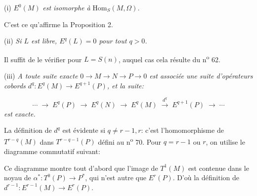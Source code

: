 (i) $E^0(M)$ \textit{est isomorphe à} $\mathrm{Hom}_S(M, \Omega)$.

C'est ce qu'affirme la Proposition 2.

(ii) \textit{Si $L$ est libre, $E^q(L) = 0$ pour tout $q > 0$.}

Il suffit de le vérifier pour $L = S(n)$, auquel cas cela résulte du n\textsuperscript{o} 62.

(iii) \textit{A toute suite exacte $0 \to M \to N \to P \to 0$ est associée une suite d'opérateurs cobords $d^q\colon E^q(M) \to E^{q+1}(P)$, et la suite:}

\begin{equation*}
\cdots \;\to\; E^q(P) \;\to\; E^q(N) \;\to\; E^q(M) \;\xrightarrow{\ d^q\ }\; E^{q+1}(P) \;\to\; \cdots
\end{equation*}
\textit{est exacte.}

La définition de $d^q$ est évidente si $q \neq r - 1, r$: c'est l'homomorphisme de $T^{r-q}(M)$ dans $T^{r-q-1}(P)$ défini au n\textsuperscript{o} 70. Pour $q = r - 1$ ou $r$, on utilise le diagramme commutatif suivant:

\begin{center}
\end{center}
Ce diagramme montre tout d'abord que l'image de $T^1(M)$ est contenue dans le noyau de $\alpha^*\colon T^0(P) \to P^*$, qui n'est autre que $E^r(P)$. D'où la définition de $d^{r-1}\colon E^{r-1}(M) \to E^r(P)$.

